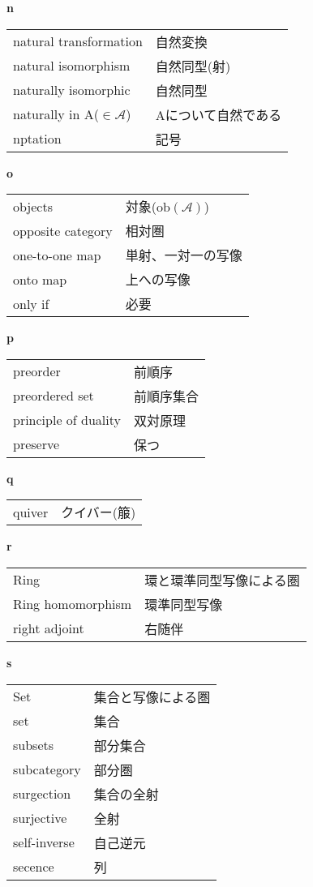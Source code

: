\documentclass[dvipdfmx]{jsarticle}
\begin{document}
\textbf{n}

  \begin{tabular}{ll}
    natural transformation & 自然変換 \\
    natural isomorphism & 自然同型(射) \\
    naturally isomorphic & 自然同型 \\
    naturally in A($\in \mathscr{A}$) & Aについて自然である \\
    nptation & 記号 \\
  \end{tabular}

\textbf{o}

  \begin{tabular}{ll}
    objects & 対象($\mathrm{ob}(\mathscr{A})$) \\
    opposite category & 相対圏 \\
    one-to-one map & 単射、一対一の写像 \\
    onto map & 上への写像 \\
    only if & 必要 \\
  \end{tabular}

\textbf{p}

  \begin{tabular}{ll}
    preorder & 前順序 \\
    preordered set & 前順序集合 \\
    principle of duality & 双対原理 \\
    preserve & 保つ \\
  \end{tabular}

\textbf{q}

  \begin{tabular}{ll}
    quiver & クイバー(箙)
  \end{tabular}

\textbf{r}

  \begin{tabular}{ll}
    Ring & 環と環準同型写像による圏 \\
    Ring homomorphism & 環準同型写像 \\
    right adjoint & 右随伴 \\
  \end{tabular}

\textbf{s}

  \begin{tabular}{ll}
    Set & 集合と写像による圏 \\
    set & 集合 \\
    subsets & 部分集合 \\
    subcategory & 部分圏 \\
    surgection & 集合の全射 \\
    surjective & 全射 \\
    self-inverse & 自己逆元 \\
    secence & 列 \\
  \end{tabular}
\end{document}
